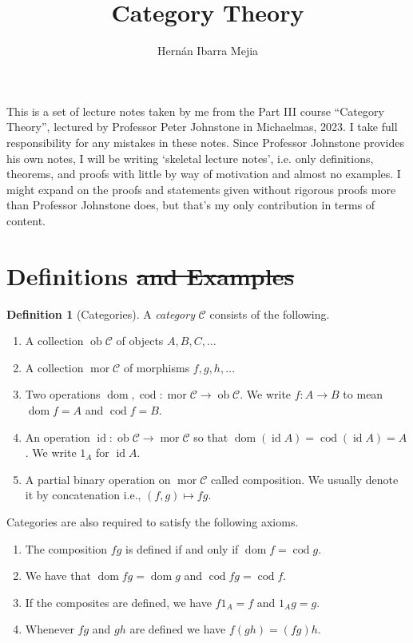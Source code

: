 \documentclass{report}
\DeclareMathOperator{\id}{id}
\DeclareMathOperator{\ob}{ob}
\DeclareMathOperator{\mor}{mor}
\DeclareMathOperator{\dom}{dom}
\DeclareMathOperator{\cod}{cod}
\theoremstyle{definition}
\theoremstyle{plain}
\theoremstyle{definition}
\newtheorem{defn}[thm]{Definition}
\begin{document}
	\title{Category Theory}
	\author{Hernán Ibarra Mejia}
	\maketitle
	\tableofcontents
	\newpage
	This is a set of lecture notes taken by me from the Part III course ``Category Theory'', lectured by Professor Peter Johnstone in Michaelmas, 2023. I take full responsibility for any mistakes in these notes. Since Professor Johnstone provides his own notes, I will be writing `skeletal lecture notes', i.e. only definitions, theorems, and proofs with little by way of motivation and almost no examples. I might expand on the proofs and statements given without rigorous proofs more than Professor Johnstone does, but that's my only contribution in terms of content.
	\section{Definitions \sout{and Examples}}
	\begin{defn}[Categories]
		A \emph{category} $\mathcal{C}$ consists of the following.
		\begin{enumerate}
			\item A collection $\ob \mathcal{C}$ of objects $A,B,C,\ldots$
			\item A collection $\mor \mathcal{C}$ of morphisms $f,g,h,\ldots$
			\item Two operations $\dom,\cod\colon \mor \mathcal{C} \to \ob\mathcal{C}$. We write $f\colon A \to B$ to mean $\dom f =A$ and $\cod f = B$.
			\item An operation $\id \colon \ob \mathcal{C} \to \mor \mathcal{C}$ so that $\dom (\id A) = \cod (\id A) = A$. We write $1_A$ for $\id A$.
			\item A partial binary operation on $\mor \mathcal{C}$ called composition. We usually denote it by concatenation i.e., $(f,g)\mapsto fg$. 
		\end{enumerate}
		Categories are also required to satisfy the following axioms.
		\begin{enumerate}
			\item The composition $fg$ is defined if and only if $\dom f = \cod g$.
			\item We have that $\dom fg = \dom g$ and $\cod fg = \cod f$.
			\item If the composites are defined, we have $f1_A = f$ and $1_Ag = g$. 
			\item Whenever $fg$ and $gh$ are defined we have $f(gh) = (fg)h$.
		\end{enumerate}
	\end{defn}
\end{document}
